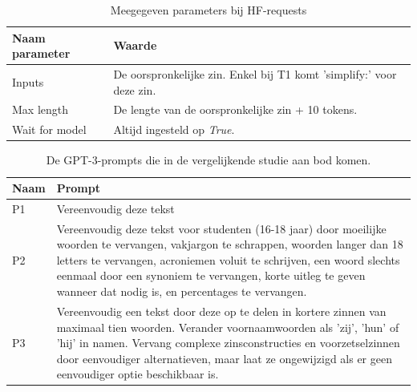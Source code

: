 \begin{center}
	\begin{table}[H]
		\begin{tabular}{ | m{6cm} | m{8cm} | } 
			\hline
			\textbf{Naam parameter} & \textbf{Waarde} \\
			\hline
			Inputs & De oorspronkelijke zin. Enkel bij T1 komt 'simplify:' voor deze zin. \\
			\hline
			Max length & De lengte van de oorspronkelijke zin + 10 tokens. \\
			\hline
			Wait for model & Altijd ingesteld op \textit{True}. \\
			\hline
		\end{tabular}
		\caption{Meegegeven parameters bij HF-requests}
		\label{table:huggingface-requests-parameters}
	\end{table}
\end{center}

\begin{center}
	\begin{table}[H]
		\begin{tabular}{ | m{2cm} | m{13cm} | } 
			\hline
			\textbf{Naam} & \textbf{Prompt} \\
			\hline
			P1 & Vereenvoudig deze tekst \\
			\hline
			P2 & Vereenvoudig deze tekst voor studenten (16-18 jaar) door moeilijke woorden te vervangen, vakjargon te schrappen, woorden langer dan 18 letters te vervangen, acroniemen voluit te schrijven, een woord slechts eenmaal door een synoniem te vervangen, korte uitleg te geven wanneer dat nodig is, en percentages te vervangen. \\
			\hline
			P3 & Vereenvoudig een tekst door deze op te delen in kortere zinnen van maximaal tien woorden. Verander voornaamwoorden als 'zij', 'hun' of 'hij' in namen. Vervang complexe zinsconstructies en voorzetselzinnen door eenvoudiger alternatieven, maar laat ze ongewijzigd als er geen eenvoudiger optie beschikbaar is. \\
			\hline
		\end{tabular}
		\caption{De GPT-3-prompts die in de vergelijkende studie aan bod komen.}
		\label{table:tested-prompts}
	\end{table}
\end{center}

